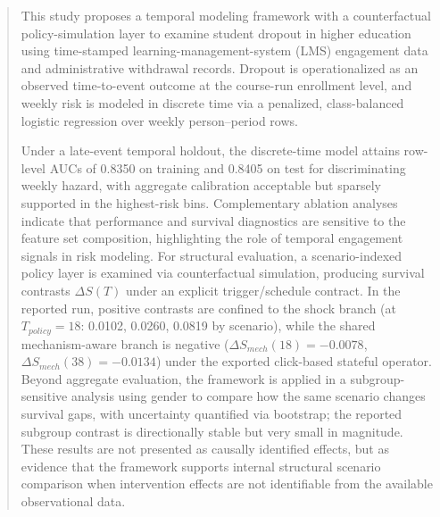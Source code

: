 \begin{abstract}
This study proposes a temporal modeling framework with a counterfactual policy-simulation layer to examine student dropout in higher education using time-stamped learning-management-system (LMS) engagement data and administrative withdrawal records. Dropout is operationalized as an observed time-to-event outcome at the course-run enrollment level, and weekly risk is modeled in discrete time via a penalized, class-balanced logistic regression over weekly person--period rows.

Under a late-event temporal holdout, the discrete-time model attains row-level AUCs of 0.8350 on training and 0.8405 on test for discriminating weekly hazard, with aggregate calibration acceptable but sparsely supported in the highest-risk bins. Complementary ablation analyses indicate that performance and survival diagnostics are sensitive to the feature set composition, highlighting the role of temporal engagement signals in risk modeling. For structural evaluation, a scenario-indexed policy layer is examined via counterfactual simulation, producing survival contrasts $\Delta S(T)$ under an explicit trigger/schedule contract. In the reported run, positive contrasts are confined to the shock branch (at $T_{policy}=18$: 0.0102, 0.0260, 0.0819 by scenario), while the shared mechanism-aware branch is negative ($\Delta S_{mech}(18)=-0.0078$, $\Delta S_{mech}(38)=-0.0134$) under the exported click-based stateful operator. Beyond aggregate evaluation, the framework is applied in a subgroup-sensitive analysis using gender to compare how the same scenario changes survival gaps, with uncertainty quantified via bootstrap; the reported subgroup contrast is directionally stable but very small in magnitude. These results are not presented as causally identified effects, but as evidence that the framework supports internal structural scenario comparison when intervention effects are not identifiable from the available observational data.
\end{abstract}